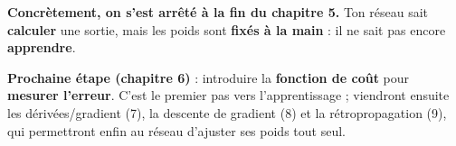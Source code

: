 \documentclass[11pt]{article}
\begin{document}
\textbf{Concrètement, on s'est arrêté à la fin du chapitre 5.} Ton réseau sait
\textbf{calculer} une sortie, mais les poids sont \textbf{fixés à la main} : il ne
sait pas encore \textbf{apprendre}.

\textbf{Prochaine étape (chapitre 6)} : introduire la \textbf{fonction de coût}
pour \textbf{mesurer l'erreur}. C'est le premier pas vers l'apprentissage ;
viendront ensuite les dérivées/gradient (7), la descente de gradient (8) et la
rétropropagation (9), qui permettront enfin au réseau d'ajuster ses poids tout
seul.
\end{document}
